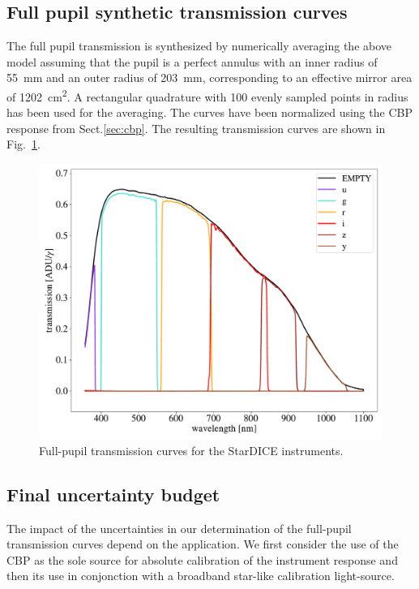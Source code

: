 \subsection{Full pupil synthetic transmission curves}

The full pupil transmission is synthesized by numerically averaging
the above model assuming that the pupil is a perfect annulus with an
inner radius of \SI{55}{mm} and an outer radius of \SI{203}{mm}, corresponding to an effective mirror area of \SI{1202}{cm^2}. A
rectangular quadrature with 100 evenly sampled points in radius has
been used for the averaging. The curves have been normalized using the
CBP response from Sect.\ref{sec:cbp}. The resulting transmission curves are shown in
Fig.~\ref{fig:fullpupiltrans}.
\begin{figure}
  \centering
  \includegraphics[width=1\linewidth]{fig/fullpupill.pdf}
  \caption{Full-pupil transmission curves for the StarDICE instruments.}
  \label{fig:fullpupiltrans}
\end{figure}


\subsection{Final uncertainty budget}

The impact of the uncertainties in our determination of the full-pupil
transmission curves depend on the application. We first consider the
use of the CBP as the sole source for absolute calibration of the
instrument response and then its use in conjonction with a broadband
star-like calibration light-source.

